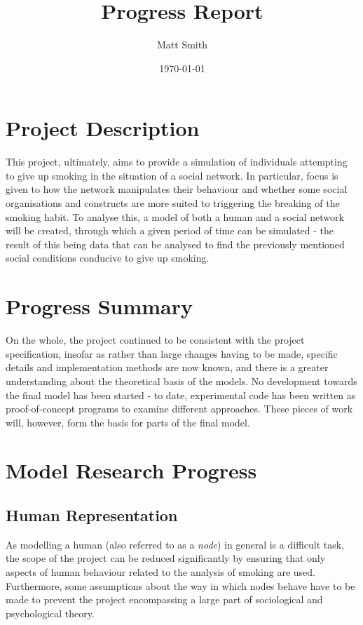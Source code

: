 \documentclass[]{article}
\begin{document}
\title{Progress Report}
\author{Matt Smith}
\date{\today}
\maketitle

\section{Project Description}

This project, ultimately, aims to provide a simulation of individuals attempting to give up smoking in the situation of a social network. In particular, focus is given to how the network manipulates their behaviour and whether some social organisations and constructs are more suited to triggering the breaking of the smoking habit. To analyse this, a model of both a human and a social network will be created, through which a given period of time can be simulated - the result of this being data that can be analysed to find the previously mentioned social conditions conducive to give up smoking.

\section{Progress Summary}

On the whole, the project continued to be consistent with the project specification, insofar as rather than large changes having to be made, specific details and implementation methods are now known, and there is a greater understanding about the theoretical basis of the models. No development towards the final model has been started - to date, experimental code has been written as proof-of-concept programs to examine different approaches. These pieces of work will, however, form the basis for parts of the final model.

\section{Model Research Progress}

\subsection{Human Representation}

As modelling a human (also referred to as a \emph{node}) in general is a difficult task, the scope of the project can be reduced significantly by ensuring that only aspects of human behaviour related to the analysis of smoking are used. Furthermore, some assumptions about the way in which nodes behave have to be made to prevent the project encompassing a large part of sociological and psychological theory. 
\end{document}

